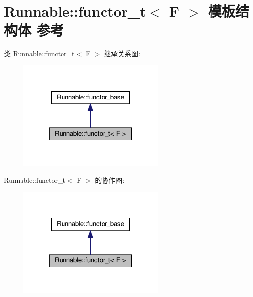 \hypertarget{structRunnable_1_1functor__t}{}\section{Runnable\+:\+:functor\+\_\+t$<$ F $>$ 模板结构体 参考}
\label{structRunnable_1_1functor__t}


类 Runnable\+:\+:functor\+\_\+t$<$ F $>$ 继承关系图\+:\nopagebreak
\begin{figure}[H]
\begin{center}
\leavevmode
\includegraphics[width=206pt]{structRunnable_1_1functor__t__inherit__graph}
\end{center}
\end{figure}


Runnable\+:\+:functor\+\_\+t$<$ F $>$ 的协作图\+:\nopagebreak
\begin{figure}[H]
\begin{center}
\leavevmode
\includegraphics[width=206pt]{structRunnable_1_1functor__t__coll__graph}
\end{center}
\end{figure}
